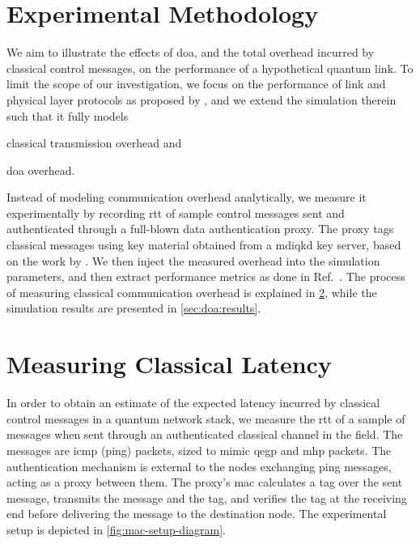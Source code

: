 \section{Experimental Methodology}
\label{sec:doa:meth}

We aim to illustrate the effects of \acrlong{doa}, and the total overhead incurred by classical
control messages, on the performance of a hypothetical quantum link. To limit the scope of our
investigation, we focus on the performance of link and physical layer protocols as proposed by
\textcite{dahlberg_2019_egp}, and we extend the simulation therein such that it fully models
%
\begin{inlinelist}
    \item classical transmission overhead and
    \item \acrshort{doa} overhead.
\end{inlinelist}

Instead of modeling communication overhead analytically, we measure it experimentally by recording
\acrfull{rtt} of sample control messages sent and authenticated through a full-blown data
authentication proxy. The proxy tags classical messages using key material obtained from a
\acrfull{mdiqkd} key server, based on the work by \textcite{berrevoets_2022_deployed}. We then
inject the measured overhead into the simulation parameters, and then extract performance metrics as
done in Ref.~\cite{dahlberg_2019_egp}. The process of measuring classical communication overhead is
explained in \cref{sec:doa:latency}, while the simulation results are presented in
\cref{sec:doa:results}.

\section{Measuring Classical Latency}
\label{sec:doa:latency}

In order to obtain an estimate of the expected latency incurred by classical control messages in a
quantum network stack, we measure the \acrfull{rtt} of a sample of messages when sent through an
authenticated classical channel in the field. The messages are \acrshort{icmp} (ping) packets, sized
to mimic \acrshort{qegp} and \acrshort{mhp} packets. The authentication mechanism is external to the
nodes exchanging ping messages, acting as a proxy between them. The proxy's \acrshort{mac}
calculates a tag over the sent message, transmits the message and the tag, and verifies the tag at
the receiving end before delivering the message to the destination node. The experimental setup is
depicted in \cref{fig:mac-setup-diagram}.


